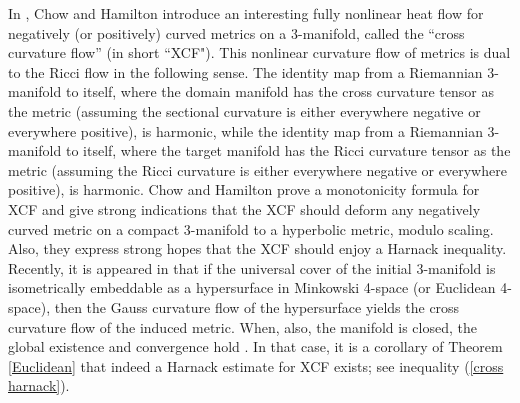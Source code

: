In \cite{ChowHamilton:/2004}, Chow and Hamilton introduce an interesting fully nonlinear heat flow for negatively (or positively) curved metrics on a 3-manifold, called the ``cross curvature flow'' (in short ``XCF"). This nonlinear curvature flow of metrics is dual to the Ricci flow in the following sense. The identity map from a Riemannian 3-manifold to itself, where the domain manifold has the cross curvature tensor as the metric (assuming the sectional curvature is either everywhere negative or everywhere positive), is harmonic, while the identity map from a Riemannian 3-manifold to itself, where the target manifold has the  Ricci curvature tensor as the metric (assuming the Ricci curvature is either everywhere negative or everywhere positive), is harmonic. Chow and Hamilton prove a monotonicity formula for XCF and give strong indications that the XCF should deform any negatively curved metric on a compact 3-manifold to a hyperbolic metric, modulo scaling. Also, they express strong hopes that the XCF should enjoy a Harnack inequality. Recently, it is appeared in \cite{AndrewsChenFangMcCoy:/2015} that if the universal cover of the initial 3-manifold is isometrically embeddable as a hypersurface in Minkowski 4-space (or Euclidean 4-space), then the Gauss curvature flow of the hypersurface yields the cross curvature flow of the induced metric. When, also, the manifold is closed, the global existence and convergence hold \cite{AndrewsChenFangMcCoy:/2015}. In that case, it is a corollary of Theorem \ref{Euclidean} that indeed a Harnack estimate for XCF exists; see inequality (\ref{cross harnack}).

